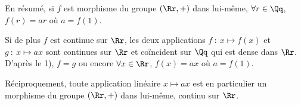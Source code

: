 {\begin{enumerate}
{En résumé, si $f$ est morphisme du groupe $(\Rr,+)$ dans lui-même, $\forall r\in\Qq$, $f(r) = ar$ où $a = f(1)$.

Si de plus $f$ est continue sur $\Rr$, les deux applications $f~:~x\mapsto f(x)$ et $g~:~x\mapsto ax$ sont continues sur $\Rr$ et coïncident sur $\Qq$ qui est dense dans $\Rr$. D'après le 1), $f = g$ ou encore $\forall x\in\Rr$, $f(x)=ax$ où $a=f(1)$.

Réciproquement, toute application linéaire $x\mapsto ax$ est en particulier un morphisme du groupe $(\Rr,+)$ dans lui-même, continu sur $\Rr$. 

\begin{center}
\end{center}}
\end{enumerate}
}
